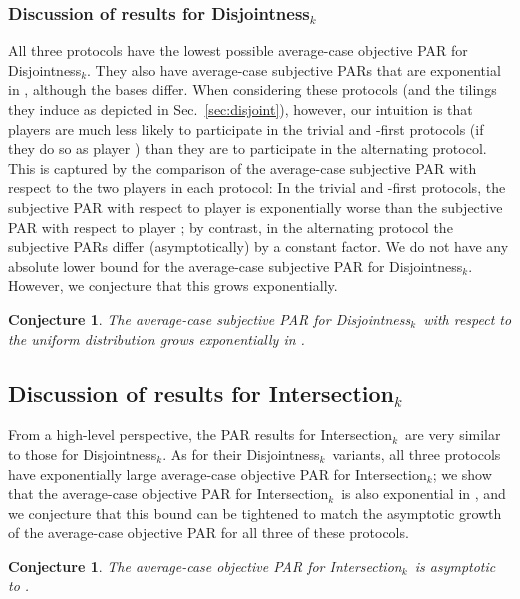 \documentclass{article}
\theoremstyle{theorem}
\newtheorem{conj}[theorem]{Conjecture}
\theoremstyle{definition}
\theoremstyle{remark}
\newcommand{\disjoint}{{\sc Dis\-joint\-ness}\ensuremath{_k}}
\newcommand{\intersection}{{\sc In\-ter\-sec\-tion}\ensuremath{_k}}
\begin{document}
\subsubsection{Discussion of results for \disjoint}

All three protocols have the lowest possible average-case objective PAR for \disjoint.  They also have average-case subjective PARs that are exponential in , although the bases differ.  When considering these protocols (and the tilings they induce as depicted in Sec.~\ref{sec:disjoint}), however, our intuition is that players are much less likely to participate in the trivial and -first protocols (if they do so as player ) than they are to participate in the alternating protocol.  This is captured by the comparison of the average-case subjective PAR with respect to the two players in each protocol: In the trivial and -first protocols, the subjective PAR with respect to player  is exponentially worse than the subjective PAR with respect to player ; by contrast, in the alternating protocol the subjective PARs differ (asymptotically) by a constant factor.  We do not have any absolute lower bound for the average-case subjective PAR for \disjoint.  However, we conjecture that this grows exponentially.
\begin{conj}
The average-case subjective PAR for \disjoint\ with respect to the uniform distribution grows exponentially in .
\end{conj}


\subsection{Discussion of results for \intersection}

From a high-level perspective, the PAR results for \intersection\ are very similar to those for \disjoint.  As for their \disjoint\ variants, all three protocols have exponentially large average-case objective PAR for \intersection; we show that the average-case objective PAR for \intersection\ is also exponential in , and we conjecture that this bound can be tightened to match the  asymptotic growth of the average-case objective PAR for all three of these protocols.

\begin{conj}
The average-case objective PAR for \intersection\ is asymptotic to .
\end{conj}
\end{document}
